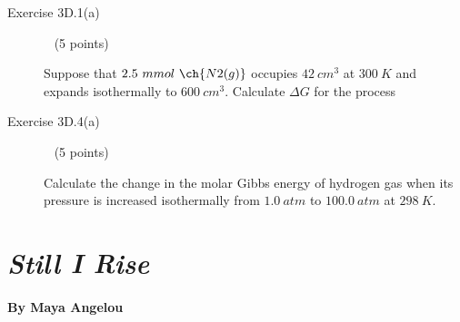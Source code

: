 \documentclass[12pt, openany, letterpaper]{memoir}
\begin{document}
\begin{description}
	      \vspace{20em}

	\item [Exercise 3D.1(a)] ~ (5 points)

	      Suppose that $2.5~mmol~\ch{N2(g)}$ occupies $42~cm^3$ at $300~K$ and expands isothermally to $600~cm^3$. Calculate $\Delta G$ for the process

	      \vspace{12em}
	\item [Exercise 3D.4(a)] ~ (5 points)

	      Calculate the change in the molar Gibbs energy of hydrogen gas when its pressure is increased isothermally from $1.0~atm$ to $100.0~atm$ at $298~K$.


\end{description}

\newpage
\pagestyle{empty}
\addtocounter{page}{-1}
\section*{\emph{Still I Rise}}
\paragraph{By Maya Angelou}~
\end{document}

